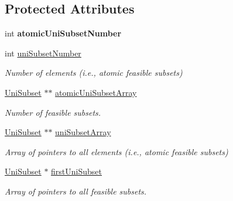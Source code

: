 \subsection*{Protected Attributes}
\begin{DoxyCompactItemize}
\item 
\hypertarget{classUniSet_addac67921c058dc9ffa2074b3d59151f}{int {\bfseries atomic\-Uni\-Subset\-Number}}\label{classUniSet_addac67921c058dc9ffa2074b3d59151f}

\item 
\hypertarget{classUniSet_a159ec0413efd05616c2f2445b7d8b2b5}{int \hyperlink{classUniSet_a159ec0413efd05616c2f2445b7d8b2b5}{uni\-Subset\-Number}}\label{classUniSet_a159ec0413efd05616c2f2445b7d8b2b5}

\begin{DoxyCompactList}\small\item\em Number of elements (i.\-e., atomic feasible subsets) \end{DoxyCompactList}\item 
\hypertarget{classUniSet_a16746d02b5503c5d8c62fe4dff46c5b3}{\hyperlink{classUniSubset}{Uni\-Subset} $\ast$$\ast$ \hyperlink{classUniSet_a16746d02b5503c5d8c62fe4dff46c5b3}{atomic\-Uni\-Subset\-Array}}\label{classUniSet_a16746d02b5503c5d8c62fe4dff46c5b3}

\begin{DoxyCompactList}\small\item\em Number of feasible subsets. \end{DoxyCompactList}\item 
\hypertarget{classUniSet_a154ae422d9f248c8b50f39d575f9b3c0}{\hyperlink{classUniSubset}{Uni\-Subset} $\ast$$\ast$ \hyperlink{classUniSet_a154ae422d9f248c8b50f39d575f9b3c0}{uni\-Subset\-Array}}\label{classUniSet_a154ae422d9f248c8b50f39d575f9b3c0}

\begin{DoxyCompactList}\small\item\em Array of pointers to all elements (i.\-e., atomic feasible subsets) \end{DoxyCompactList}\item 
\hypertarget{classUniSet_a8b2ca464176feddcd8d96c75514eba6b}{\hyperlink{classUniSubset}{Uni\-Subset} $\ast$ \hyperlink{classUniSet_a8b2ca464176feddcd8d96c75514eba6b}{first\-Uni\-Subset}}\label{classUniSet_a8b2ca464176feddcd8d96c75514eba6b}

\begin{DoxyCompactList}\small\item\em Array of pointers to all feasible subsets. \end{DoxyCompactList}\end{DoxyCompactItemize}


